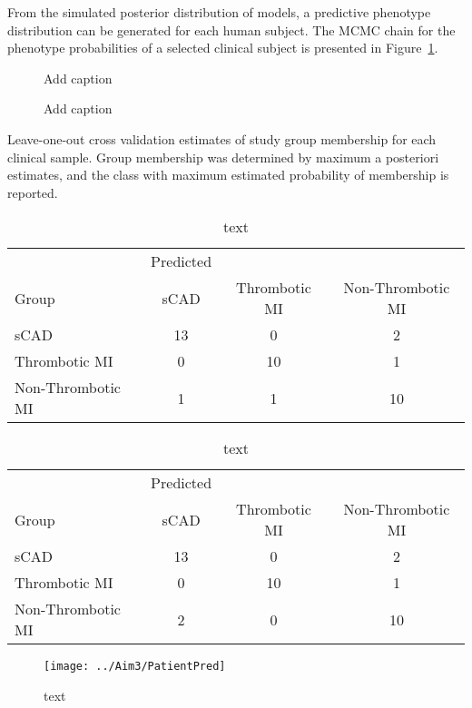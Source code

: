 From the simulated posterior distribution of models, a predictive phenotype distribution can be generated for each human subject. The MCMC chain for the phenotype probabilities of a selected clinical subject is presented in Figure~\ref{fig:ptid2010MCMC}.

\begin{figure}[H]
	\caption[Add caption]{Add caption \label{fig:ptid2010MCMC} }
\end{figure}

\begin{figure}[H]
	\caption[Add caption]{Add caption \label{fig:ptid2010Hist} }
\end{figure}
 
Leave-one-out cross validation estimates of study group membership for each clinical sample. Group membership was determined by maximum a posteriori estimates, and the class with maximum estimated probability of membership is reported.
 
 \begin{table}[H]
	\centering
 	\caption{text}
 	\label{tab:modelRes}
 	\begin{tabular}{l|ccc}
 		& Predicted & & \\
 		Group  &     sCAD & Thrombotic MI & Non-Thrombotic MI \\
 		\hline
 		sCAD   &     13    &     0    &     2\\
 		Thrombotic MI  &  0    &    10    &     1\\
 		Non-Thrombotic MI &   1    &     1   &     10
 	\end{tabular}
 \end{table}
 
  \begin{table}[H]
  	\centering
  	\caption{text}
  	\label{tab:modelRes2}
  	\begin{tabular}{l|ccc}
  		& Predicted & & \\
  		Group  &     sCAD & Thrombotic MI & Non-Thrombotic MI \\
  		\hline
  		sCAD   &     13    &     0    &     2\\
  		Thrombotic MI  &  0    &    10    &     1\\
  		Non-Thrombotic MI &   2  &   0 &    10
  	\end{tabular}
  \end{table}
  
  \begin{figure}[H]
	  	\centering
  	  	\caption{text}
 	  	\label{tab:modelRes3}
  	\texttt{[image: ../Aim3/PatientPred]}
  \end{figure}